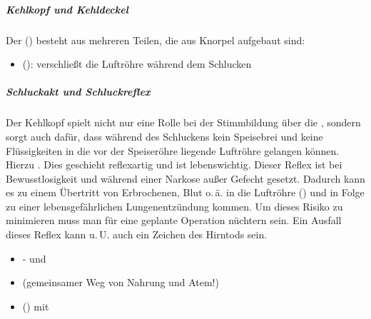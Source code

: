 {\subparagraph{Kehlkopf und Kehldeckel}
Der  () besteht aus mehreren Teilen, die aus
Knorpel aufgebaut sind:
\begin{itemize}
  \item {} (): 
  verschließt die Luftröhre während dem Schlucken
\end{itemize}

\subparagraph{Schluckakt und Schluckreflex}
Der Kehlkopf spielt nicht nur eine Rolle bei der
Stimmbildung über die , sondern sorgt auch dafür,
dass während des Schluckens kein Speisebrei und keine
Flüssigkeiten in die vor der Speiseröhre liegende Luftröhre
gelangen können. Hierzu .
Dies geschieht reflexartig und ist lebenswichtig.
Dieser Reflex ist bei Bewusstlosigkeit und während einer
Narkose außer Gefecht gesetzt.
Dadurch kann es zu einem Übertritt von
Erbrochenen, Blut o.\,ä. in die Luftröhre
() und in Folge zu einer lebensgefährlichen
Lungenentzündung kommen.
Um dieses Risiko zu minimieren muss man für eine
geplante Operation nüchtern sein.
Ein Ausfall dieses Reflex kann u.\,U. auch ein Zeichen des
Hirntods sein.
}{%
\begin{itemize}
    \item {}- und   
    \item {} (gemeinsamer Weg von Nahrung und
    Atem!)  
    \item {} () mit
       
\end{itemize}
}{}{}{}

